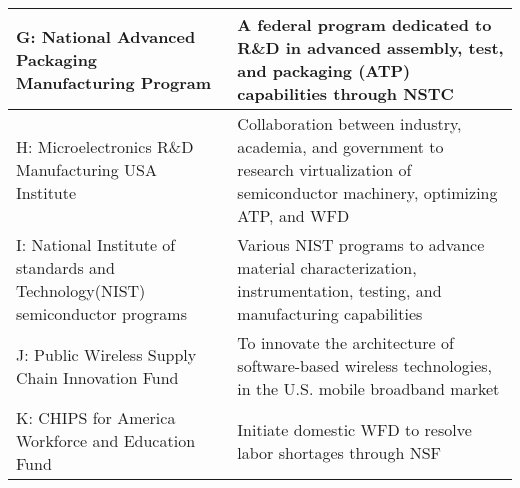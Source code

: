 \begin{center}
\begin{table*}
{\begin{tabularx}{0.99\textwidth}{|X|X|}
  \hline
  G: National Advanced Packaging Manufacturing Program & 
  A federal program dedicated to R\&D in advanced assembly, test, and packaging (ATP) capabilities through NSTC\\
  \hline
  H: Microelectronics R\&D Manufacturing USA Institute &
  Collaboration between industry, academia, and government to research virtualization of semiconductor machinery, optimizing ATP, and WFD\\
  \hline
  I: National Institute of standards and Technology(NIST) semiconductor programs &
  Various NIST programs to advance material characterization, instrumentation, testing, and manufacturing capabilities\\
  \hline
  J: Public Wireless Supply Chain Innovation Fund &
  To innovate the architecture of software-based wireless technologies, in the U.S. mobile broadband market\\
  \hline
  K: CHIPS for America Workforce and Education Fund &
  Initiate domestic WFD to resolve labor shortages through NSF\\ 
  \hline
\end{tabularx}}
\end{table*}
\end{center}

